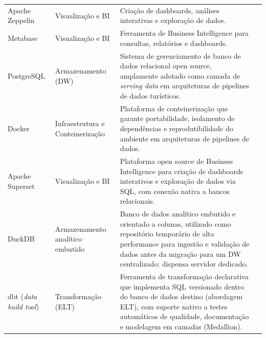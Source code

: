 \begin{longtable}{
    >{\raggedright\arraybackslash}p{2.8cm}
    >{\raggedright\arraybackslash}p{2.8cm}
    >{\raggedright\arraybackslash}p{6.2cm}
    >{\raggedright\arraybackslash}p{2.2cm}
}
Apache Zeppelin &
Visualização e BI &
Criação de dashboards, análises interativas e exploração de dados. &
\cite[]{septian2019} \\

\rowcolor[gray]{0.96}
Metabase &
Visualização e BI &
Ferramenta de Business Intelligence para consultas, relatórios e dashboards. &
\cite[]{septian2019} \\

PostgreSQL &
Armazenamento (DW) &
Sistema de gerenciamento de banco de dados relacional open source, amplamente adotado como camada de \textit{serving data} em arquiteturas de pipelines de dados turísticos. &
\cite[]{figueira2025arquitetura} \\

\rowcolor[gray]{0.96}
Docker &
Infraestrutura e Conteinerização &
Plataforma de conteinerização que garante portabilidade, isolamento de dependências e reprodutibilidade do ambiente em arquiteturas de pipelines de dados. &
\cite[]{figueira2025arquitetura} \\

Apache Superset &
Visualização e BI &
Plataforma open source de Business Intelligence para criação de dashboards interativos e exploração de dados via SQL, com conexão nativa a bancos relacionais. &
\cite[]{figueira2025arquitetura} \\

\rowcolor[gray]{0.96}
DuckDB &
Armazenamento analítico embutido &
Banco de dados analítico embutido e orientado a colunas, utilizado como repositório temporário de alta performance para ingestão e validação de dados antes da migração para um DW centralizado; dispensa servidor dedicado. &
\cite[]{gargouri2026multi} \\

dbt (\textit{data build tool}) &
Transformação (ELT) &
Ferramenta de transformação declarativa que implementa SQL versionado dentro do banco de dados destino (abordagem ELT), com suporte nativo a testes automáticos de qualidade, documentação e modelagem em camadas (Medallion). &
\cite[]{gargouri2026multi, jin2025elt} \\

\end{longtable}